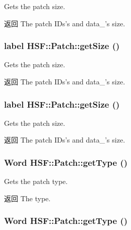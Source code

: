Gets the patch size. \begin{DoxyReturn}{返回}
The patch IDs's and data\_\-'s size. 
\end{DoxyReturn}
\hypertarget{classHSF_1_1Patch_a2710e0b6ccba9c2a5462d77a83a077ba}{
\subsubsection[{getSize}]{\setlength{\rightskip}{0pt plus 5cm}label HSF::Patch::getSize ()}}
\label{classHSF_1_1Patch_a2710e0b6ccba9c2a5462d77a83a077ba}


Gets the patch size. \begin{DoxyReturn}{返回}
The patch IDs's and data\_\-'s size. 
\end{DoxyReturn}
\hypertarget{classHSF_1_1Patch_a2710e0b6ccba9c2a5462d77a83a077ba}{
\subsubsection[{getSize}]{\setlength{\rightskip}{0pt plus 5cm}label HSF::Patch::getSize ()}}
\label{classHSF_1_1Patch_a2710e0b6ccba9c2a5462d77a83a077ba}


Gets the patch size. \begin{DoxyReturn}{返回}
The patch IDs's and data\_\-'s size. 
\end{DoxyReturn}
\hypertarget{classHSF_1_1Patch_ae4f0f1deddb67c117a07175c20854506}{
\subsubsection[{getType}]{\setlength{\rightskip}{0pt plus 5cm}Word HSF::Patch::getType ()}}
\label{classHSF_1_1Patch_ae4f0f1deddb67c117a07175c20854506}


Gets the patch type. \begin{DoxyReturn}{返回}
The type. 
\end{DoxyReturn}
\hypertarget{classHSF_1_1Patch_ae4f0f1deddb67c117a07175c20854506}{
\subsubsection[{getType}]{\setlength{\rightskip}{0pt plus 5cm}Word HSF::Patch::getType ()}}
\label{classHSF_1_1Patch_ae4f0f1deddb67c117a07175c20854506}


